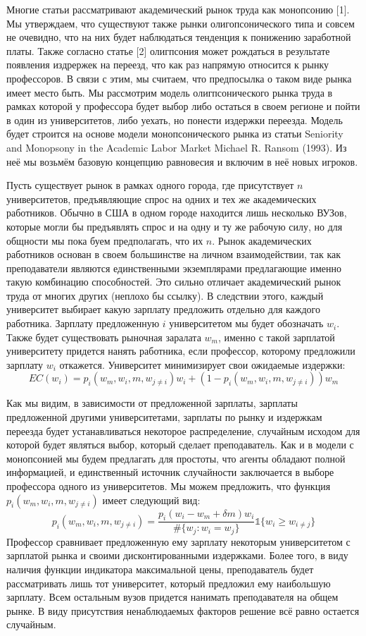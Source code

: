 \documentclass[a4paper, 12pt]{article}
\theoremstyle{definition}
\theoremstyle{plain}
\begin{document}
Многие статьи рассматривают академический рынок труда  как монопсонию [1]. Мы утверждаем, что существуют также рынки олигопсонического типа и совсем не очевидно, что на них будет наблюдаться тенденция к понижению заработной платы. Также согласно статье [2] олигпсония может рождаться в результате появления издрержек на переезд, что как раз напрямую относится к рынку профессоров. В связи с этим, мы считаем, что предпосылка о таком виде рынка имеет место быть.  Мы рассмотрим модель олигпсонического рынка труда в рамках которой у профессора будет выбор либо остаться в своем регионе и пойти в один из университетов, либо уехать, но понести издержки переезда. Модель будет строится на основе модели монопсонического рынка из статьи Seniority and Monopsony in the Academic Labor Market Michael R. Ransom (1993). Из неё мы возьмём базовую концепцию равновесия и включим в неё новых игроков. 

Пусть существует рынок в рамках одного города, где присутствует $n$ университетов, предъявляющие спрос на одних и тех же академических работников. Обычно в США в одном городе находится лишь несколько ВУЗов, которые могли бы предъявлять спрос и на одну и ту же рабочую силу, но для общности мы пока буем предполагать, что их $n$. Рынок академических работников основан в своем большинстве на личном взаимодействии, так как преподаватели являются единственными экземплярами предлагающие именно такую комбинацию способностей. Это сильно отличает академический рынок труда от многих других (неплохо бы ссылку). В следствии этого, каждый университет выбирает какую зарплату предложить отдельно для каждого работника. Зарплату предложенную $i$ университетом мы будет обозначать $w_i$. Также будет существовать рыночная заралата $w_m$, именно с такой зарплатой университету придется нанять работника, если профессор, которому предложили зарплату $w_i$ откажется. Университет минимизирует свои ожидаемые издержки: 
\[
EC(w_i) = p_i(w_m, w_i, m, w_{j \neq i})w_i + (1 - p_i(w_m, w_i, m, w_{j \neq i}))w_m
\]

Как мы видим, в зависимости от предложенной зарплаты, зарплаты предложенной другими университетами, зарплаты по рынку и издержкам переезда будет устанавливаться некоторое распределение, случайным исходом для которой будет являться выбор, который сделает преподаватель. Как и в модели с монопсонией мы будем предлагать для простоты, что агенты обладают полной информацией, и единственный источник случайности заключается в выборе профессора одного из университетов. Мы можем предложить, что функция $p_i ( w_m, w_i, m, w_{j \neq i}) $ имеет следующий вид: 
\[
p_i( w_m, w_i, m, w_{j \neq i}) = \frac{p_i(w_i - w_m + \delta m) w_i}{\#\{w_j : w_i = w_j\}}\mathds{1} \{ w_i \geq w_ {i \neq j}\}
\]
Профессор сравнивает предложенную ему зарплату некоторым университетом с зарплатой рынка и своими дисконтированными издержками. Более того, в виду наличия функции индикатора максимальной цены, преподаватель будет рассматривать лишь тот университет, который предложил ему наибольшую зарплату. Всем остальным вузов придется нанимать преподавателя на общем рынке. В виду присутствия ненаблюдаемых факторов решение всё равно остается случайным. 
\end{document}

